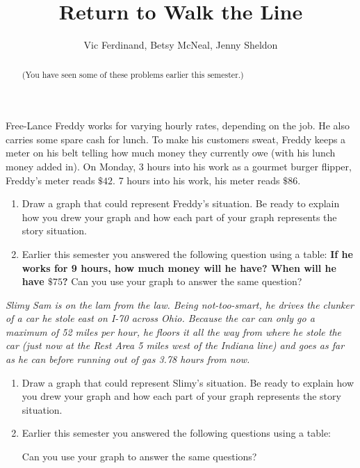 \documentclass{ximera}
\title{Return to Walk the Line}
\author{Vic Ferdinand, Betsy McNeal, Jenny Sheldon}
\begin{document}
\begin{abstract}
 (You have seen some of these problems earlier this semester.)
\end{abstract}
\maketitle



\begin{problem}
 Free-Lance Freddy works for varying hourly rates, depending on the
job.  He also carries some spare cash for lunch.  To make his
customers sweat, Freddy keeps a meter on his belt telling how much
money they currently owe (with his lunch money added in).  On Monday, 3 hours into his work as a gourmet burger flipper,
  Freddy's meter reads $\$42$. 7 hours into his work, his meter reads
  $\$86$.  
  \begin{enumerate}
  \item Draw a graph that could represent Freddy's situation. Be ready to explain how you drew your graph and how each part of your graph represents the story situation.
  \item Earlier this semester you answered the following question using a table:  {\bf If he works for 9 hours, how much money will he have?  When
  will he have $\$75$?}  Can you use your graph to answer the same question?
  \end{enumerate}
\end{problem}


\begin{problem}
\emph{Slimy Sam is on the lam from the law.  Being not-too-smart, he drives
the clunker of a car he stole east on I-70 across Ohio.  Because the
car can only go a maximum of 52 miles per hour, he floors it all the
way from where he stole the car (just now at the Rest Area 5 miles
west of the Indiana line) and goes as far as he can before running out
of gas 3.78 hours from now.}
 \begin{enumerate}
  \item Draw a graph that could represent Slimy's situation.  Be ready to explain how you drew your graph and how each part of your graph represents the story situation.

  \item Earlier this semester you answered the following questions using a table:  
Can you use your graph to answer the same questions?

\end{enumerate}

\end{problem}
\end{document}
